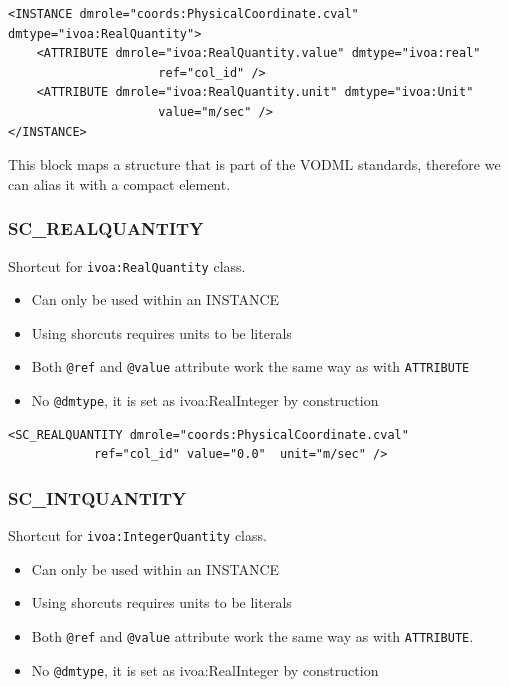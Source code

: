 \documentclass[11pt,a4paper]{ivoa}
\begin{document}
\begin{lstlisting}[caption={ivoa:RealQuantity example},style=XML]
<INSTANCE dmrole="coords:PhysicalCoordinate.cval"
dmtype="ivoa:RealQuantity">
    <ATTRIBUTE dmrole="ivoa:RealQuantity.value" dmtype="ivoa:real"
                     ref="col_id" />
    <ATTRIBUTE dmrole="ivoa:RealQuantity.unit" dmtype="ivoa:Unit"
                     value="m/sec" />
</INSTANCE>
\end{lstlisting}



This block maps a structure that is part of the VODML standards, therefore we can alias it with a compact element.

\subsubsection{SC\_REALQUANTITY}
Shortcut for \texttt{ivoa:RealQuantity} class.

\begin{itemize}
    \item Can only be used within an INSTANCE      
    \item Using shorcuts requires units to be literals   
    \item Both \texttt{@ref} and \texttt{@value} attribute work the same way as with \texttt{ATTRIBUTE}
    \item No \texttt{@dmtype},  it is set as ivoa:RealInteger by construction
 \end{itemize}


\begin{lstlisting}[caption={\texttt{ivoa:RealQuantity} example},style=XML]
<SC_REALQUANTITY dmrole="coords:PhysicalCoordinate.cval"
            ref="col_id" value="0.0"  unit="m/sec" />
\end{lstlisting}

\subsubsection{SC\_INTQUANTITY}
Shortcut for \texttt{ivoa:IntegerQuantity} class.

\begin{itemize}
    \item Can only be used within an INSTANCE        
    \item Using shorcuts requires units to be literals    
    \item Both \texttt{@ref} and \texttt{@value} attribute work the same way as with \texttt{ATTRIBUTE}.
    \item No \texttt{@dmtype},  it is set as ivoa:RealInteger by construction
 \end{itemize}
\end{document}
